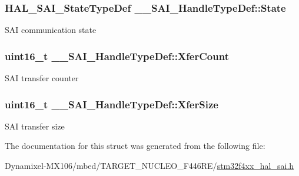\subsubsection[{\texorpdfstring{State}{State}}]{ {\bf H\+A\+L\+\_\+\+S\+A\+I\+\_\+\+State\+Type\+Def} \+\_\+\+\_\+\+S\+A\+I\+\_\+\+Handle\+Type\+Def\+::\+State}\hypertarget{struct_____s_a_i___handle_type_def_a89c4679bb5c61aea9b747791a7ec5a5b}{}\label{struct_____s_a_i___handle_type_def_a89c4679bb5c61aea9b747791a7ec5a5b}
S\+AI communication state 
\subsubsection[{\texorpdfstring{Xfer\+Count}{XferCount}}]{\setlength{\rightskip}{0pt plus 5cm}uint16\+\_\+t \+\_\+\+\_\+\+S\+A\+I\+\_\+\+Handle\+Type\+Def\+::\+Xfer\+Count}\hypertarget{struct_____s_a_i___handle_type_def_abef6c492c344416c607ddf6bcd0869ac}{}\label{struct_____s_a_i___handle_type_def_abef6c492c344416c607ddf6bcd0869ac}
S\+AI transfer counter 
\subsubsection[{\texorpdfstring{Xfer\+Size}{XferSize}}]{\setlength{\rightskip}{0pt plus 5cm}uint16\+\_\+t \+\_\+\+\_\+\+S\+A\+I\+\_\+\+Handle\+Type\+Def\+::\+Xfer\+Size}\hypertarget{struct_____s_a_i___handle_type_def_a8f3114ca6990b3c9efafcdd76c8e21f2}{}\label{struct_____s_a_i___handle_type_def_a8f3114ca6990b3c9efafcdd76c8e21f2}
S\+AI transfer size 

The documentation for this struct was generated from the following file\+:\begin{DoxyCompactItemize}
\item 
Dynamixel-\/\+M\+X106/mbed/\+T\+A\+R\+G\+E\+T\+\_\+\+N\+U\+C\+L\+E\+O\+\_\+\+F446\+R\+E/\hyperlink{stm32f4xx__hal__sai_8h}{stm32f4xx\+\_\+hal\+\_\+sai.\+h}\end{DoxyCompactItemize}
